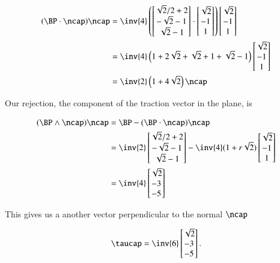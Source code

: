 \begin{align*}
(\BP \cdot \ncap) \ncap
&=
\inv{4}
\left(
\begin{bmatrix}
\sqrt{2}/2 + 2 \\
-\sqrt{2} -1 \\
\sqrt{2} - 1
\end{bmatrix}
\cdot 
\begin{bmatrix}
\sqrt{2} \\
-1 \\
1
\end{bmatrix} 
\right)
\begin{bmatrix}
\sqrt{2} \\
-1 \\
1
\end{bmatrix}  \\
&=
\inv{4}
\left( 
1 + 2\sqrt{2}
+\sqrt{2} +1 
+\sqrt{2} - 1
\right)
\begin{bmatrix}
\sqrt{2} \\
-1 \\
1
\end{bmatrix}  \\
&=
\inv{2}
\left( 
1 + 4\sqrt{2}
\right)
\ncap
\end{align*}

Our rejection, the component of the traction vector in the plane, is

\begin{align*}
(\BP \wedge \ncap) \ncap 
&=
\BP - (\BP \cdot \ncap)\ncap \\
&=
\inv{2}
\begin{bmatrix}
\sqrt{2}/2 + 2 \\
-\sqrt{2} -1 \\
\sqrt{2} - 1
\end{bmatrix}
-\inv{4}(1 + r \sqrt{2})
\begin{bmatrix}
\sqrt{2} \\
-1 \\
1
\end{bmatrix} \\
&=
\inv{4}
\begin{bmatrix}
\sqrt{2} \\
-3 \\
-5
\end{bmatrix}
\end{align*}

This gives us a another vector perpendicular to the normal $\ncap$

\begin{equation}\label{eqn:continuumProblemSet1:490}
\taucap = 
\inv{6}
\begin{bmatrix}
\sqrt{2} \\
-3 \\
-5
\end{bmatrix}.
\end{equation}

